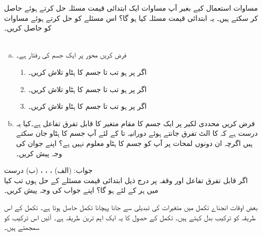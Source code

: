 مساوات  استعمال کیے بغیر آپ مساوات  ایک ابتدائی قیمت مسئلہ حل کرتے ہوئے حاصل کر سکتے ہیں۔ یہ ابتدائی قیمت مسئلہ کیا ہو گا؟ اس مسئلے کو حل کرتے ہوئے مساوات  کو حاصل کریں۔
\\
\\
\begin{enumerate}[a.]
\item
فرض کریں محور  پر ایک جسم کی رفتار  ہے۔
\begin{enumerate}[1.]
\item
اگر  پر  ہو تب  تا  جسم کا ہٹاو تلاش کریں۔
\item
اگر  پر  ہو تب  تا  جسم کا ہٹاو تلاش کریں۔
\item
اگر  پر  ہو تب  تا  جسم کا ہٹاو تلاش کریں۔
\end{enumerate}
\item
فرض کریں محددی لکیر پر ایک جسم کا مقام  متغیر  کا قابل تفرق تفاعل ہے۔کیا یہ درست ہے کہ  کا الٹ تفرق جانتے ہوئے دورانیہ  تا  کے لئے آپ جسم کا ہٹاو جان سکتے ہیں اگرچہ ان دونوں لمحات پر آپ کو جسم کا ہٹاو معلوم نہیں ہے؟ اپنے جوان کی وجہ پیش کریں۔  
\end{enumerate}
جواب:\quad
(الف) ، ،  ، (ب)  درست
\\
اگر قابل تفرق تفاعل  اور  وقفہ  پر درج ذیل ابتدائی قیمت مسئلے کے حل ہوں تب کیا  میں ہر  کے لئے  ہو گا؟ اپنے جواب کی وجہ پیش کریں۔

بعض اوقات انجناے تکمل میں  متغیرات کی تبدیلی سے جانا پہچانا تکمل حاصل ہوتا ہے۔ تکمل کے اس طریقہ کو ترکیب بدل کہتے ہیں۔  تکمل کے حصول کا یہ ایک اہم ترین طریقہ ہے۔ آئیں اس ترکیب کو سمجھتے ہیں۔

